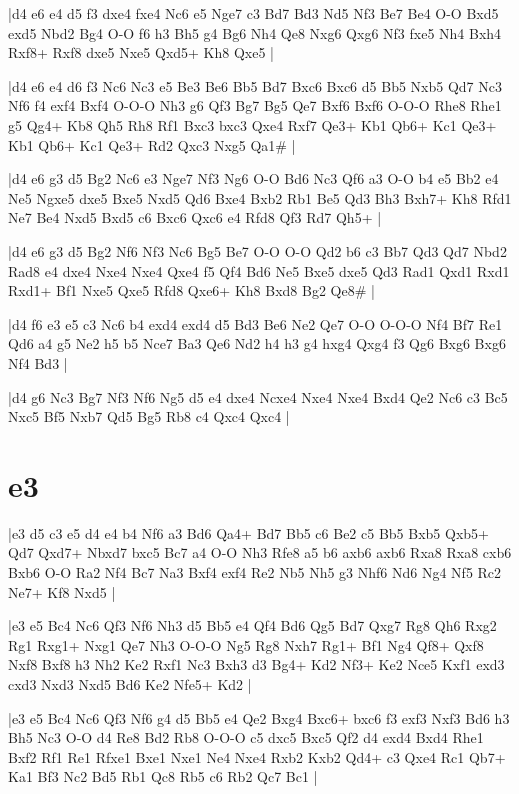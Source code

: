 \whitename{}
\blackname{}
\makegametitle
|d4 e6 e4 d5 f3 dxe4 fxe4 Nc6 e5 Nge7 c3 Bd7 Bd3 Nd5 Nf3 Be7 Be4 O-O Bxd5 exd5 Nbd2 Bg4 O-O f6 h3 Bh5 g4 Bg6 Nh4 Qe8 Nxg6 Qxg6 Nf3 fxe5 Nh4 Bxh4 Rxf8+ Rxf8 dxe5 Nxe5 Qxd5+ Kh8 Qxe5  |

\whitename{}
\blackname{}
\makegametitle
|d4 e6 e4 d6 f3 Nc6 Nc3 e5 Be3 Be6 Bb5 Bd7 Bxc6 Bxc6 d5 Bb5 Nxb5 Qd7 Nc3 Nf6 f4 exf4 Bxf4 O-O-O Nh3 g6 Qf3 Bg7 Bg5 Qe7 Bxf6 Bxf6 O-O-O Rhe8 Rhe1 g5 Qg4+ Kb8 Qh5 Rh8 Rf1 Bxc3 bxc3 Qxe4 Rxf7 Qe3+ Kb1 Qb6+ Kc1 Qe3+ Kb1 Qb6+ Kc1 Qe3+ Rd2 Qxc3 Nxg5 Qa1\#  |

\whitename{}
\blackname{}
\makegametitle
|d4 e6 g3 d5 Bg2 Nc6 e3 Nge7 Nf3 Ng6 O-O Bd6 Nc3 Qf6 a3 O-O b4 e5 Bb2 e4 Ne5 Ngxe5 dxe5 Bxe5 Nxd5 Qd6 Bxe4 Bxb2 Rb1 Be5 Qd3 Bh3 Bxh7+ Kh8 Rfd1 Ne7 Be4 Nxd5 Bxd5 c6 Bxc6 Qxc6 e4 Rfd8 Qf3 Rd7 Qh5+  |


\whitename{}
\blackname{}
\makegametitle
|d4 e6 g3 d5 Bg2 Nf6 Nf3 Nc6 Bg5 Be7 O-O O-O Qd2 b6 c3 Bb7 Qd3 Qd7 Nbd2 Rad8 e4 dxe4 Nxe4 Nxe4 Qxe4 f5 Qf4 Bd6 Ne5 Bxe5 dxe5 Qd3 Rad1 Qxd1 Rxd1 Rxd1+ Bf1 Nxe5 Qxe5 Rfd8 Qxe6+ Kh8 Bxd8 Bg2 Qe8\#  |

\whitename{}
\blackname{}
\makegametitle
|d4 f6 e3 e5 c3 Nc6 b4 exd4 exd4 d5 Bd3 Be6 Ne2 Qe7 O-O O-O-O Nf4 Bf7 Re1 Qd6 a4 g5 Ne2 h5 b5 Nce7 Ba3 Qe6 Nd2 h4 h3 g4 hxg4 Qxg4 f3 Qg6 Bxg6 Bxg6 Nf4 Bd3  |

\whitename{}
\blackname{}
\makegametitle
|d4 g6 Nc3 Bg7 Nf3 Nf6 Ng5 d5 e4 dxe4 Ncxe4 Nxe4 Nxe4 Bxd4 Qe2 Nc6 c3 Bc5 Nxc5 Bf5 Nxb7 Qd5 Bg5 Rb8 c4 Qxc4 Qxc4  |

\section{e3}

\whitename{}
\blackname{}
\makegametitle
|e3 d5 c3 e5 d4 e4 b4 Nf6 a3 Bd6 Qa4+ Bd7 Bb5 c6 Be2 c5 Bb5 Bxb5 Qxb5+ Qd7 Qxd7+ Nbxd7 bxc5 Bc7 a4 O-O Nh3 Rfe8 a5 b6 axb6 axb6 Rxa8 Rxa8 cxb6 Bxb6 O-O Ra2 Nf4 Bc7 Na3 Bxf4 exf4 Re2 Nb5 Nh5 g3 Nhf6 Nd6 Ng4 Nf5 Rc2 Ne7+ Kf8 Nxd5  |

\whitename{}
\blackname{}
\makegametitle
|e3 e5 Bc4 Nc6 Qf3 Nf6 Nh3 d5 Bb5 e4 Qf4 Bd6 Qg5 Bd7 Qxg7 Rg8 Qh6 Rxg2 Rg1 Rxg1+ Nxg1 Qe7 Nh3 O-O-O Ng5 Rg8 Nxh7 Rg1+ Bf1 Ng4 Qf8+ Qxf8 Nxf8 Bxf8 h3 Nh2 Ke2 Rxf1 Nc3 Bxh3 d3 Bg4+ Kd2 Nf3+ Ke2 Nce5 Kxf1 exd3 cxd3 Nxd3 Nxd5 Bd6 Ke2 Nfe5+ Kd2  |

\whitename{}
\blackname{}
\makegametitle
|e3 e5 Bc4 Nc6 Qf3 Nf6 g4 d5 Bb5 e4 Qe2 Bxg4 Bxc6+ bxc6 f3 exf3 Nxf3 Bd6 h3 Bh5 Nc3 O-O d4 Re8 Bd2 Rb8 O-O-O c5 dxc5 Bxc5 Qf2 d4 exd4 Bxd4 Rhe1 Bxf2 Rf1 Re1 Rfxe1 Bxe1 Nxe1 Ne4 Nxe4 Rxb2 Kxb2 Qd4+ c3 Qxe4 Rc1 Qb7+ Ka1 Bf3 Nc2 Bd5 Rb1 Qc8 Rb5 c6 Rb2 Qc7 Bc1  |

